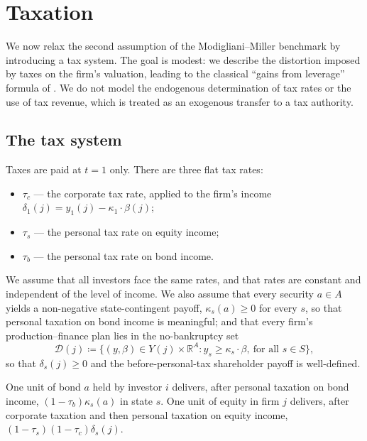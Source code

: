 \documentclass[11pt,a4paper,oneside]{book}
\def\R{\mathbb{R}}
\def\geq{\geqslant}
\theoremstyle{plain}
\theoremstyle{definition}
\theoremstyle{remark}
\numberwithin{equation}{chapter}
\begin{document}
\section{Taxation}
\label{sec:tax}

We now relax the second assumption of the Modigliani--Miller benchmark by introducing a tax system.
The goal is modest: we describe the distortion imposed by taxes on the firm's valuation, leading to the classical ``gains from leverage'' formula of \citet{ModiglianiMiller1958, Miller1977}.
We do not model the endogenous determination of tax rates or the use of tax revenue, which is treated as an exogenous transfer to a tax authority.

\subsection{The tax system}

Taxes are paid at $t=1$ only.
There are three flat tax rates:
\begin{itemize}
  \item $\tau_c$ --- the corporate tax rate, applied to the firm's income $\delta_1(j) = y_1(j) - \kappa_1 \cdot \beta(j)$;
  \item $\tau_s$ --- the personal tax rate on equity income;
  \item $\tau_b$ --- the personal tax rate on bond income.
\end{itemize}
We assume that all investors face the same rates, and that rates are constant and independent of the level of income.
We also assume that every security $a \in A$ yields a non-negative state-contingent payoff, $\kappa_s(a) \geq 0$ for every $s$, so that personal taxation on bond income is meaningful; and that every firm's production--finance plan lies in the no-bankruptcy set
\begin{equation*}
  \mathcal{D}(j) \coloneqq \bigl\{ (y, \beta) \in Y(j) \times \R^A \colon y_s \geq \kappa_s \cdot \beta, \ \text{for all $s\in S$} \bigr\},
\end{equation*}
so that $\delta_s(j) \geq 0$ and the before-personal-tax shareholder payoff is well-defined.

One unit of bond $a$ held by investor $i$ delivers, after personal taxation on bond income, $(1-\tau_b) \kappa_s(a)$ in state $s$.
One unit of equity in firm $j$ delivers, after corporate taxation and then personal taxation on equity income, $(1-\tau_s)(1-\tau_c) \delta_s(j)$.
\end{document}
